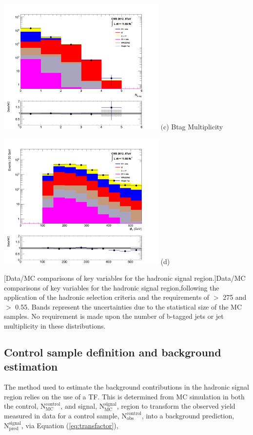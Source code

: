 \begin{minipage}{\linewidth}
\begin{minipage}{.48\textwidth}
\centering
\includegraphics[width = 3.3in]{plots/had_nbtag_datamc.pdf}
$\text{(c}$) Btag Multiplicity
\end{minipage}
\begin{minipage}{.48\textwidth}
\centering
\includegraphics[width = 3.3in]{plots/had_mht_datamc.pdf}
(d) \mht
\end{minipage}
[Data/MC comparisons of key variables for the hadronic signal region.]{Data/MC comparisons of key variables for the hadronic signal region,following the application of the hadronic selection criteria and the requirements of \theht $>$ 275 \GeV and \alphat $>$ 0.55. Bands represent the uncertainties due to the statistical size of the MC samples. No requirement is made upon the number of b-tagged jets or jet multiplicity in these distributions.}\label{fig:hadmcplots}
\end{minipage}

\subsection{Control sample definition and background estimation}
\label{subsec:controlsampledefinition}

The method used to estimate the background contributions in the hadronic signal region relies on the use of a \acf{TF}. This is determined from MC simulation in both the control, $\text{N}_{\text{MC}}^{\text{control}}$, and signal, $\text{N}_{\text{MC}}^{\text{signal}}$, region to transform the observed yield measured in data for a control sample,  $\text{N}_{\text{obs}}^{\text{control}}$, into a background prediction, $\text{N}_{\text{pred}}^{\text{signal}}$, via Equation (\ref{eq:transfactor}),

